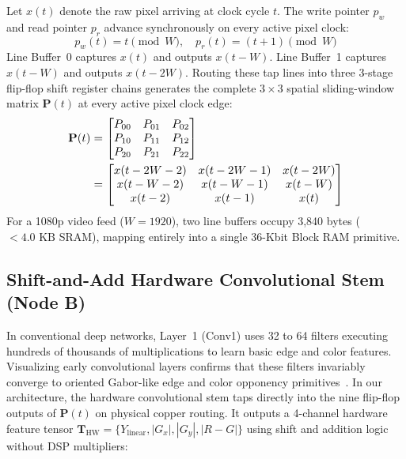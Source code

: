 \documentclass[conference]{IEEEtran}
\begin{document}
Let $x(t)$ denote the raw pixel arriving at clock cycle $t$. The write pointer $p_w$ and read pointer $p_r$ advance synchronously on every active pixel clock:
\begin{equation}
p_w(t) = t \pmod W, \quad p_r(t) = (t + 1) \pmod W
\end{equation}
Line Buffer~0 captures $x(t)$ and outputs $x(t - W)$. Line Buffer~1 captures $x(t - W)$ and outputs $x(t - 2W)$. Routing these tap lines into three 3-stage flip-flop shift register chains generates the complete $3\times3$ spatial sliding-window matrix $\mathbf{P}(t)$ at every active pixel clock edge:
\begin{equation}
\label{eq:sliding_window}
\resizebox{0.72\columnwidth}{!}{$
\begin{aligned}
\mathbf{P}(t) &= \begin{bmatrix}
P_{00} & P_{01} & P_{02} \\
P_{10} & P_{11} & P_{12} \\
P_{20} & P_{21} & P_{22}
\end{bmatrix} \\
&= \begin{bmatrix}
x(t - 2W - 2) & x(t - 2W - 1) & x(t - 2W) \\
x(t - W - 2)  & x(t - W - 1)  & x(t - W)  \\
x(t - 2)      & x(t - 1)      & x(t)
\end{bmatrix}
\end{aligned}
$}
\end{equation}
For a 1080p video feed ($W=1920$), two line buffers occupy 3,840 bytes ($<4.0\text{ KB}$ SRAM), mapping entirely into a single 36-Kbit Block RAM primitive.

\subsection{Shift-and-Add Hardware Convolutional Stem (Node B)}
In conventional deep networks, Layer~1 (Conv1) uses 32 to 64 filters executing hundreds of thousands of multiplications to learn basic edge and color features. Visualizing early convolutional layers confirms that these filters invariably converge to oriented Gabor-like edge and color opponency primitives~\cite{zeiler2014visualizing}. In our architecture, the hardware convolutional stem taps directly into the nine flip-flop outputs of $\mathbf{P}(t)$ on physical copper routing. It outputs a 4-channel hardware feature tensor $\mathbf{T}_{\text{HW}} = \{Y_{\text{linear}}, |G_x|, |G_y|, |R-G|\}$ using shift and addition logic without DSP multipliers:
\end{document}
